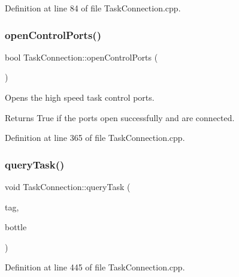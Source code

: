 Definition at line 84 of file Task\+Connection.\+cpp.

\hypertarget{classocra__recipes_1_1TaskConnection_ab7feddafb3948aaf67bf00b227591694}{}\label{classocra__recipes_1_1TaskConnection_ab7feddafb3948aaf67bf00b227591694} 
\subsubsection{\texorpdfstring{open\+Control\+Ports()}{openControlPorts()}}
{\footnotesize\ttfamily bool Task\+Connection\+::open\+Control\+Ports (\begin{DoxyParamCaption}{ }\end{DoxyParamCaption})}

Opens the high speed task control ports.

\begin{DoxyReturn}{Returns}
True if the ports open successfully and are connected. 
\end{DoxyReturn}


Definition at line 365 of file Task\+Connection.\+cpp.

\hypertarget{classocra__recipes_1_1TaskConnection_ae4450b3d9912471527716d7fe11e279e}{}\label{classocra__recipes_1_1TaskConnection_ae4450b3d9912471527716d7fe11e279e} 
\subsubsection{\texorpdfstring{query\+Task()}{queryTask()}}
{\footnotesize\ttfamily void Task\+Connection\+::query\+Task (\begin{DoxyParamCaption}\item[{\hyperlink{namespaceocra_ae51761f3980546f5ee4cbc6ebe4216dd}{ocra\+::\+T\+A\+S\+K\+\_\+\+M\+E\+S\+S\+A\+GE}}]{tag,  }\item[{yarp\+::os\+::\+Bottle \&}]{bottle }\end{DoxyParamCaption})}



Definition at line 445 of file Task\+Connection.\+cpp.

